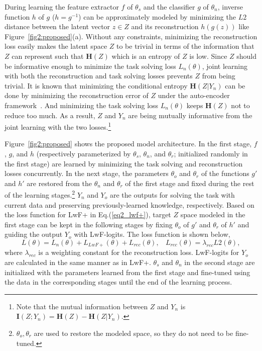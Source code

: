 \documentclass[runningheads,a4paper]{llncs}
\begin{document}
During learning the feature extractor $f$ of $\theta_s$ and the classifier $g$ of $\theta_n$, inverse function $h$ of $g$ ($h=g^{-1}$) can be approximately modeled by minimizing the $L2$ distance between the latent vector $z \in Z$ and its reconstruction $h(g(z))$ like Figure~\ref{fig2:proposed}(a). Without any constraints, minimizing the reconstruction loss easily makes the latent space $Z$ to be trivial in terms of the information that $Z$ can represent such that $\textbf{H}(Z)$ which is an entropy of $Z$ is low. Since $Z$ should be informative enough to minimize the task solving loss $L_n(\theta)$, joint learning with both the reconstruction and task solving losses prevents $Z$ from being trivial. It is known that minimizing the conditional entropy $\textbf{H}(Z \vert Y_n)$ can be done by minimizing the reconstruction error of $Z$ under the auto-encoder framework~\cite{r13_sdae_jmlr2010}. And minimizing the task solving loss $L_n(\theta)$ keeps $\textbf{H}(Z)$ not to reduce too much. As a result, $Z$ and $Y_n$ are being mutually informative from the joint learning with the two losses.\footnote{Note that the mutual information between $Z$ and $Y_n$ is $\textbf{I}(Z; Y_n) = \textbf{H}(Z) - \textbf{H}(Z \vert Y_n)$.}

Figure~\ref{fig2:proposed} shows the proposed model architecture. In the first stage, $f$, $g$, and $h$ (respectively parameterized by $\theta_s$, $\theta_n$, and $\theta_r$; initialized randomly in the first stage) are learned by minimizing the task solving and reconstruction losses concurrently. In the next stage, the parameters $\theta_o$ and $\theta_r$ of the functions $g'$ and $h'$ are restored from the $\theta_n$ and $\theta_r$ of the first stage and fixed during the rest of the learning stages.\footnote{$\theta_o, \theta_r$ are used to restore the modeled space, so they do not need to be fine-tuned.} $Y_n$ and $Y_o$ are the outputs for solving the task with current data and preserving previously-learned knowledge, respectively. Based on the loss function for LwF+ in Eq.(\ref{eq2_lwf+}), target $Z$ space modeled in the first stage can be kept in the following stages by fixing $\theta_o$ of $g'$ and $\theta_r$ of $h'$ and guiding the output $Y_o$ with LwF-logits. The loss function is shown below,
\begin{equation} \label{eq7_proposed}
	L(\theta) = L_n(\theta) + L_{LwF+}(\theta) + L_{rec}(\theta), ~~~~ L_{rec}(\theta) = \lambda_{rec} L2(\theta),
\end{equation}
\noindent where $\lambda_{rec}$ is a weighting constant for the reconstruction loss. LwF-logits for $Y_o$ are calculated in the same manner as in LwF+. $\theta_s$ and $\theta_n$ in the second stage are initialized with the parameters learned from the first stage and fine-tuned using the data in the corresponding stages until the end of the learning process.
\end{document}
